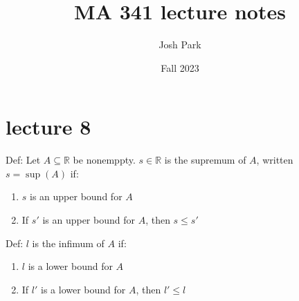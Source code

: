 \documentclass{report}
\title{MA 341 lecture notes}
\author{Josh Park}
\date{Fall 2023}
\newcommand{\bbR}{\mathbb{R}}  %
\theoremstyle{mystyle}
\theoremstyle{customtheorem}
\begin{document}
    \maketitle
    \setlength{\parindent}{0pt}
    \section*{lecture 8}
    Def: Let $A \subseteq \bbR$ be nonemppty. $s \in \bbR$ is the supremum of $A$, written $s=\sup(A)$ if:
    \begin{enumerate}[label=(\roman*)] \vspace{-1em}
        \item $s$ is an upper bound for $A$
        \item If $s'$ is an upper bound for $A$, then $s \leq s'$
    \end{enumerate}

    Def: $l$ is the infimum of $A$ if: \vspace{-1em}
    \begin{enumerate}[label=(\roman*)]
        \item $l$ is a lower bound for $A$
        \item If $l'$ is a lower bound for $A$, then $l'\leq l$
    \end{enumerate}
\end{document}
